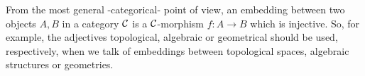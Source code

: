 \documentclass[12pt]{article}
\begin{document}
From the most general -categorical- point of view, an embedding between two objects $A,B$ in a category $\cal{C}$ is a $\cal{C}$-morphism $f\colon A\to B$ which is injective. So, for example, the adjectives topological, algebraic or geometrical should be used, respectively, when we talk of embeddings between topological spaces, algebraic structures or geometries.  
\end{document}
